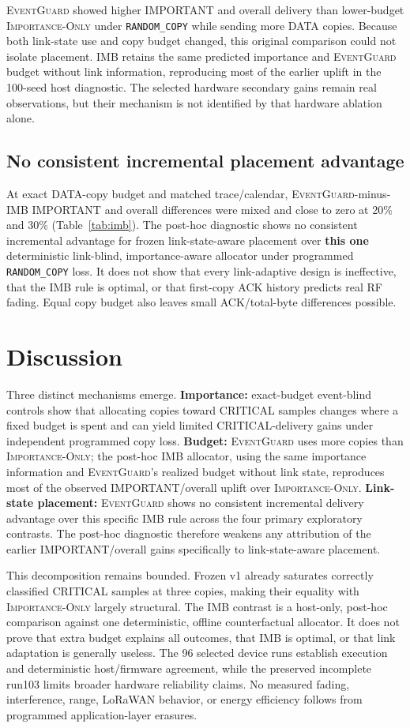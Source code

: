 \documentclass[11pt]{article}
\newcommand{\EG}{\textsc{EventGuard}}
\newcommand{\IO}{\textsc{Importance-Only}}
\begin{document}
\EG{} showed higher IMPORTANT and overall delivery than lower-budget \IO{} under \texttt{RANDOM\_COPY} while sending more DATA copies. Because both link-state use and copy budget changed, this original comparison could not isolate placement. IMB retains the same predicted importance and \EG{} budget without link information, reproducing most of the earlier uplift in the 100-seed host diagnostic. The selected hardware secondary gains remain real observations, but their mechanism is not identified by that hardware ablation alone.

\subsection{No consistent incremental placement advantage}

At exact DATA-copy budget and matched trace/calendar, \EG{}-minus-IMB IMPORTANT and overall differences were mixed and close to zero at 20\% and 30\% (Table~\ref{tab:imb}). The post-hoc diagnostic shows no consistent incremental advantage for frozen link-state-aware placement over \textbf{this one} deterministic link-blind, importance-aware allocator under programmed \texttt{RANDOM\_COPY} loss. It does not show that every link-adaptive design is ineffective, that the IMB rule is optimal, or that first-copy ACK history predicts real RF fading. Equal copy budget also leaves small ACK/total-byte differences possible.

\section{Discussion}\label{sec:discussion}

Three distinct mechanisms emerge. \textbf{Importance:} exact-budget event-blind controls show that allocating copies toward CRITICAL samples changes where a fixed budget is spent and can yield limited CRITICAL-delivery gains under independent programmed copy loss. \textbf{Budget:} \EG{} uses more copies than \IO{}; the post-hoc IMB allocator, using the same importance information and \EG{}'s realized budget without link state, reproduces most of the observed IMPORTANT/overall uplift over \IO{}. \textbf{Link-state placement:} \EG{} shows no consistent incremental delivery advantage over this specific IMB rule across the four primary exploratory contrasts. The post-hoc diagnostic therefore weakens any attribution of the earlier IMPORTANT/overall gains specifically to link-state-aware placement.

This decomposition remains bounded. Frozen v1 already saturates correctly classified CRITICAL samples at three copies, making their equality with \IO{} largely structural. The IMB contrast is a host-only, post-hoc comparison against one deterministic, offline counterfactual allocator. It does not prove that extra budget explains all outcomes, that IMB is optimal, or that link adaptation is generally useless. The 96 selected device runs establish execution and deterministic host/firmware agreement, while the preserved incomplete run103 limits broader hardware reliability claims. No measured fading, interference, range, LoRaWAN behavior, or energy efficiency follows from programmed application-layer erasures.
\end{document}
